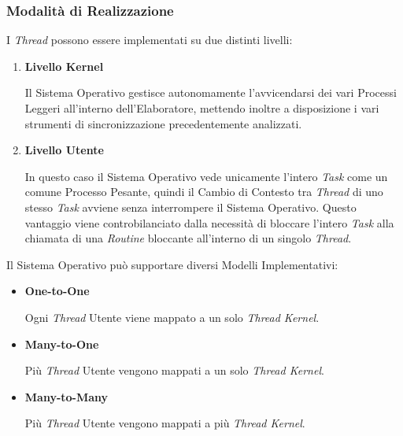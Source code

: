 \subsubsection{Modalità di Realizzazione}
I \textit{Thread} possono essere implementati su due distinti livelli:
\begin{enumerate}
    \item \textbf{Livello Kernel} \par
    Il Sistema Operativo gestisce autonomamente l'avvicendarsi dei vari Processi Leggeri all'interno dell'Elaboratore, mettendo inoltre a disposizione i vari strumenti di sincronizzazione precedentemente analizzati.
    \item \textbf{Livello Utente} \par
    In questo caso il Sistema Operativo vede unicamente l'intero \textit{Task} come un comune Processo Pesante, quindi il Cambio di Contesto tra \textit{Thread} di uno stesso \textit{Task} avviene senza interrompere il Sistema Operativo. Questo vantaggio viene controbilanciato dalla necessità di bloccare l'intero \textit{Task} alla chiamata di una \textit{Routine} bloccante all'interno di un singolo \textit{Thread}.
\end{enumerate}
Il Sistema Operativo può supportare diversi Modelli Implementativi:
\begin{itemize}
    \item \textbf{One-to-One} \par
    Ogni \textit{Thread} Utente viene mappato a un solo \textit{Thread Kernel}.
    \item \textbf{Many-to-One} \par
    Più \textit{Thread} Utente vengono mappati a un solo \textit{Thread Kernel}.
    \item \textbf{Many-to-Many} \par
    Più \textit{Thread} Utente vengono mappati a più \textit{Thread Kernel}.
\end{itemize}